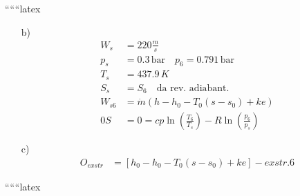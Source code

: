 ``````latex

\begin{itemize}
    \item[b)] 
    \begin{align*}
        W_s &= 220 \frac{m}{s} \\
        p_s &= 0.3 \, \text{bar} \quad p_6 = 0.791 \, \text{bar} \\
        T_s &= 437.9 \, K \\
        S_s &= S_6 \quad \text{da rev. adiabant.} \\
        W_{s6} &= \dot{m} (h - h_0 - T_0 (s - s_0) + ke) \\
        0S &= 0 = cp \ln \left( \frac{T_6}{T_s} \right) - R \ln \left( \frac{p_6}{p_s} \right)
    \end{align*}
    
    \item[c)] 
    \begin{align*}
        O_{exstr} &= [h_0 - h_0 - T_0 (s - s_0) + ke] - exstr.6
    \end{align*}
\end{itemize}

``````latex


